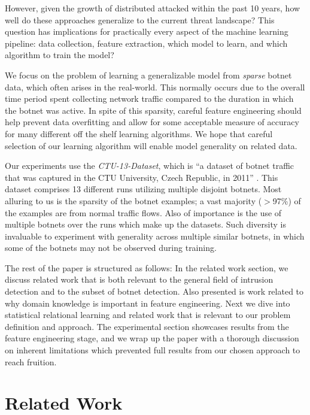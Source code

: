 \documentclass[letterpaper]{article}
\begin{document}
However, given the growth of distributed attacked within the past 10 years, how well do these approaches generalize to the current threat landscape?  This question has implications for practically every aspect of the machine learning pipeline: data collection, feature extraction, which model to learn, and which algorithm to train the model?

We focus on the problem of learning a generalizable model from \emph{sparse} botnet data, which often arises in the real-world.  This normally occurs due to the overall time period spent collecting network traffic compared to the duration in which the botnet was active.  In spite of this sparsity, careful feature engineering should help prevent data overfitting and allow for some acceptable measure of accuracy for many different off the shelf learning algorithms.  We hope that careful selection of our learning algorithm will enable model generality on related data.

Our experiments use the \emph{CTU-13-Dataset}, which is ``a dataset of botnet traffic that was captured in the CTU University, Czech Republic, in 2011'' \cite{garcia2014empirical}.  This dataset comprises 13 different runs utilizing multiple disjoint botnets.  Most alluring to us is the sparsity of the botnet examples; a vast majority ($>$97\%) of the examples are from normal traffic flows.  Also of importance is the use of multiple botnets over the runs which make up the datasets.  Such diversity is invaluable to experiment with generality across multiple similar botnets, in which some of the botnets may not be observed during training.

The rest of the paper is structured as follows:  In the related work section, we discuss related work that is both relevant to the general field of intrusion detection and to the subset of botnet detection.  Also presented is work related to why domain knowledge is important in feature engineering.  Next we dive into statistical relational learning and related work that is relevant to our problem definition and approach.  The experimental section showcases results from the feature engineering stage, and we wrap up the paper with a thorough discussion on inherent limitations which prevented full results from our chosen approach to reach fruition.

\section{Related Work}
\end{document}
